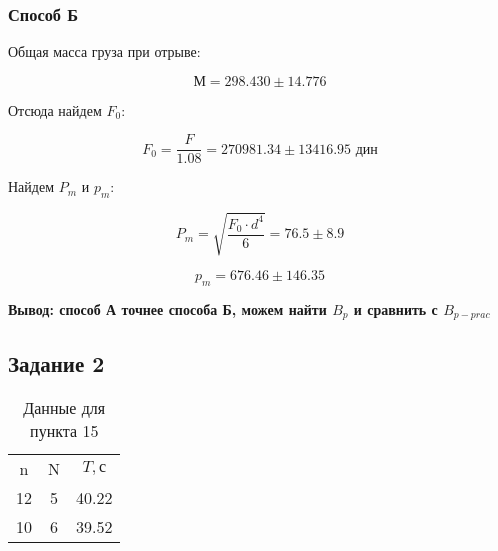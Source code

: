 \documentclass[a4paper]{article}
\begin{document}
\subsubsection{Способ Б}
Общая масса груза при отрыве:
\begin{center}
    \begin{equation}
         М = 298.430 \pm 14.776
    \end{equation}    
\end{center}

Отсюда найдем $F_0$:
\begin{center}
    \begin{equation}
         F_0 = \frac{F}{1.08} = 270981.34 \pm 13416.95 \textit{ дин}
    \end{equation}    
\end{center}

Найдем $P_m$ и $p_m$:
\begin{center}
    \begin{equation}
         P_m = \sqrt{\frac{F_0\cdot d^4}{6}} = 76.5 \pm 8.9
    \end{equation}    
\end{center}

\begin{center}
    \begin{equation}
         p_m = 676.46 \pm 146.35
    \end{equation}    
\end{center}

\textbf{Вывод: способ А точнее способа Б, можем найти $B_p$ и сравнить с $B_{p-prac}$}

\subsection{Задание 2}

\begin{table}[h]
    \centering
        \begin{tabular}{|c|c|c|}
        \cline{1-3}
        n & N & $T, \textit{с}$\\ \cline{1-3}
        12 & 5 & 40.22\\ \cline{1-3}
        10 & 6 & 39.52\\ \cline{1-3}
        \end{tabular}
        \caption{Данные для пункта 15}
        \label{tab:my_label}
    \end{table}
\end{document}
